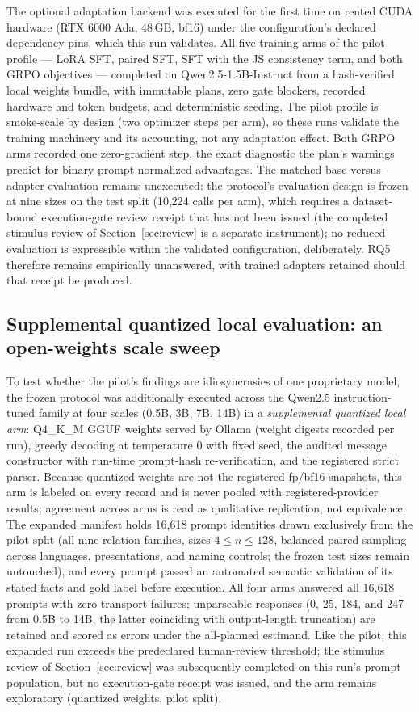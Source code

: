 The optional adaptation backend was executed for the first time on rented CUDA hardware (RTX 6000 Ada,
48\,GB, bf16) under the configuration's declared dependency pins, which this run validates. All five
training arms of the pilot profile --- LoRA SFT, paired SFT, SFT with the JS consistency term, and both
GRPO objectives --- completed on Qwen2.5-1.5B-Instruct from a hash-verified local weights bundle, with
immutable plans, zero gate blockers, recorded hardware and token budgets, and deterministic seeding. The
pilot profile is smoke-scale by design (two optimizer steps per arm), so these runs validate the training
machinery and its accounting, not any adaptation effect. Both GRPO arms recorded one zero-gradient step,
the exact diagnostic the plan's warnings predict for binary prompt-normalized advantages. The matched
base-versus-adapter evaluation remains unexecuted: the protocol's evaluation design is frozen at nine
sizes on the test split (10,224 calls per arm), which requires a dataset-bound execution-gate review
receipt that has not been issued (the completed stimulus review of Section~\ref{sec:review} is a separate
instrument); no reduced evaluation is expressible within the validated configuration, deliberately. RQ5
therefore remains empirically unanswered, with trained adapters retained should that receipt be produced.

\subsection{Supplemental quantized local evaluation: an open-weights scale sweep}
\label{sec:p1-local}

To test whether the pilot's findings are idiosyncrasies of one proprietary model, the frozen protocol was
additionally executed across the Qwen2.5 instruction-tuned family at four scales (0.5B, 3B, 7B, 14B) in a
\emph{supplemental quantized local arm}: Q4\_K\_M GGUF weights served by Ollama (weight digests recorded
per run), greedy decoding at temperature 0 with fixed seed, the audited message constructor with run-time
prompt-hash re-verification, and the registered strict parser. Because quantized weights are not the
registered fp/bf16 snapshots, this arm is labeled on every record and is never pooled with
registered-provider results; agreement across arms is read as qualitative replication, not equivalence.
The expanded manifest holds 16{,}618 prompt identities drawn exclusively from the pilot split (all nine
relation families, sizes $4 \le n \le 128$, balanced paired sampling across languages, presentations, and
naming controls; the frozen test sizes remain untouched), and every prompt passed an automated semantic
validation of its stated facts and gold label before execution. All four arms answered all 16{,}618
prompts with zero transport failures; unparseable responses (0, 25, 184, and 247 from 0.5B to 14B, the
latter coinciding with output-length truncation) are retained and scored as errors under the all-planned
estimand. Like the pilot, this expanded run exceeds the predeclared human-review threshold; the stimulus
review of Section~\ref{sec:review} was subsequently completed on this run's prompt population, but no
execution-gate receipt was issued, and the arm remains exploratory (quantized weights, pilot split).

